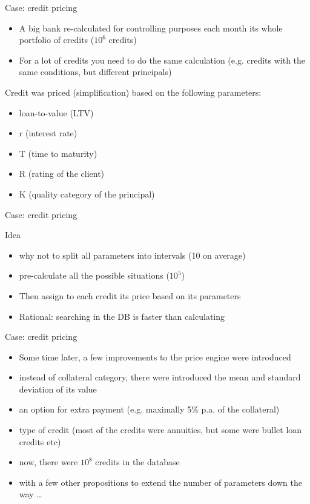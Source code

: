 \documentclass[presentation]{beamer}
\begin{document}
\begin{frame}[label=sec-3-7]{Case: credit pricing}
\begin{itemize}
\item A big bank re-calculated for controlling purposes each month its whole portfolio of credits ($10^6$ credits)
\item For a lot of credits you need to do the same calculation (e.g. credits with the same conditions, but different principals)
\end{itemize}
\begin{block}{Credit was priced (simplification) based on the following parameters:}
\begin{itemize}
\item loan-to-value (LTV)
\item r (interest rate)
\item T (time to maturity)
\item R (rating of the client)
\item K (quality category of the principal)
\end{itemize}
\end{block}
\end{frame}
\begin{frame}[label=sec-3-8]{Case: credit pricing}
\begin{block}{Idea}
\begin{itemize}
\item why not to split all parameters into intervals (10 on average)
\item pre-calculate all the possible situations ($10^5$)
\item Then assign to each credit its price based on its parameters
\item Rational: searching in the DB is faster than calculating
\end{itemize}
\end{block}
\end{frame}
\begin{frame}[label=sec-3-9]{Case: credit pricing}
\begin{itemize}
\item Some time later, a few improvements to the price engine were introduced
\item instead of collateral category, there were introduced the mean and standard deviation of its value
\item an option for extra payment (e.g. maximally 5\% p.a. of the collateral)
\item type of credit (most of the credits were annuities, but some were bullet loan credits etc)
\item now, there were $10^8$ credits in the database
\item with a few other propositions to extend the number of parameters down the way \ldots{}
\end{itemize}
\end{frame}
\end{document}
